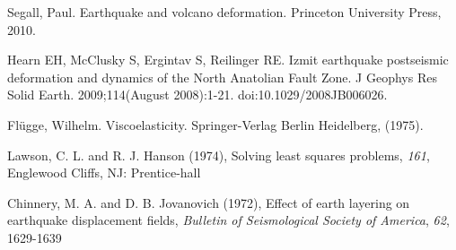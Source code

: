 \documentclass[12pt]{article}
\begin{document}
\begin{thebibliography}{}
 Segall, Paul. Earthquake and
  volcano deformation. Princeton University Press, 2010.

 Hearn EH, McClusky S, Ergintav S,
  Reilinger RE. Izmit earthquake postseismic deformation and dynamics
  of the North Anatolian Fault Zone. J Geophys Res Solid
  Earth. 2009;114(August 2008):1-21. doi:10.1029/2008JB006026.





 Fl\"ugge,
  Wilhelm. Viscoelasticity. Springer-Verlag Berlin Heidelberg, (1975).

 Lawson, C. L. and
  R. J. Hanson (1974), Solving least squares problems, {\textit{161}},
  Englewood Cliffs, NJ: Prentice-hall

 Chinnery,
  M. A. and D. B. Jovanovich (1972), Effect of earth layering on
  earthquake displacement fields, {\textit{Bulletin of Seismological
      Society of America}}, \textit{62}, 1629-1639


\end{thebibliography}
\end{document}
